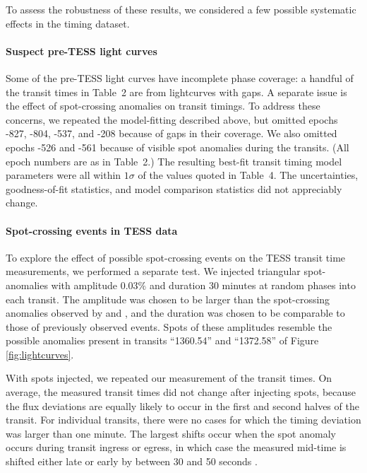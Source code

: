 \documentclass[12pt,twocolumn,tighten]{aastex62}
\begin{document}
To assess the robustness of these results, we considered a few
possible systematic effects in the timing dataset.  

\paragraph{Suspect pre-TESS light curves}
Some of the pre-TESS light curves have incomplete phase coverage: a
handful of the transit times in Table~2 are from lightcurves with
gaps.  A separate issue is the effect of spot-crossing anomalies on
transit timings.  To address these concerns, we repeated the
model-fitting described above, but omitted epochs -827, -804, -537,
and -208 because of gaps in their coverage.  We also omitted epochs
-526 and -561 because of visible spot anomalies during the transits.
(All epoch numbers are as in Table~2.)  The resulting best-fit transit
timing model parameters were all within $1\sigma$ of the values quoted
in Table~4.  The uncertainties, goodness-of-fit statistics, and model
comparison statistics did not appreciably change.

\paragraph{Spot-crossing events in TESS data}
To explore the effect of possible spot-crossing events on the TESS
transit time measurements, we performed a separate test.  We injected
triangular spot-anomalies with amplitude $0.03\%$ and duration 30
minutes at random phases into each transit.  The amplitude was chosen
to be larger than the spot-crossing anomalies observed by
\citet{southworth_high-precision_2009} and
\citet{sanchis-ojeda_starspots_2011}, and the duration was chosen to
be comparable to those of previously observed events.  Spots of these
amplitudes resemble the possible anomalies present in transits
``1360.54'' and ``1372.58'' of Figure \ref{fig:lightcurves}.

With spots injected, we repeated our measurement of the transit times.
On average, the measured transit times did not change after injecting
spots, because the flux deviations are equally likely to occur in the
first and second halves of the transit.  For individual transits,
there were no cases for which the timing deviation was larger than one
minute.  The largest shifts occur when the spot anomaly occurs during
transit ingress or egress, in which case the measured mid-time is
shifted either late or early by between 30 and 50 seconds
\citep[qualitatively similar to results found
by][]{ioannidis_how_2016}.
\end{document}
